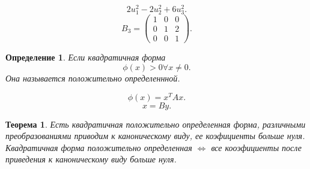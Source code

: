 \documentclass{scrartcl}
\newtheorem{theorem}{Теорема}
\newtheorem{definition}{Определение}
\begin{document}
\[
2u_1^2 - 2u_2^2 + 6u_3^2
.\] 
\[
B_3 = 
\begin{pmatrix} 
    1 & 0 & 0\\
    0 & 1 & 2\\
    0 & 0 & 1
\end{pmatrix} 
.\] 
\begin{definition}
    Если квадратичная форма 
    \[
    \phi(x) > 0 \forall  x \neq 0
    .\] 
    Она называется положительно определеннной.
\end{definition}
\[
\phi(x) = x^{T} A x 
.\] 
\[
x = By
.\] 
\begin{theorem}
    Есть квадратичная положительно определенная форма, различными преобразованиями приводим к каноническому виду, ее коэфициенты больше нуля.\\
    Квадратичная форма положительно определенная  $\iff$ все кооэфициенты после приведения к каноническому виду больше нуля.
\end{theorem}
\end{document}
